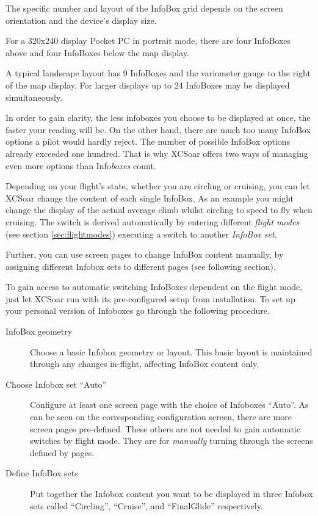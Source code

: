 The specific number and layout of the InfoBox grid depends on the
screen orientation and the device's display size.  

For a 320x240 display
Pocket PC in portrait mode, there are four InfoBoxes above and four
InfoBoxes below the map display.  %

A typical landscape layout has 9 InfoBoxes and the variometer gauge 
to the right of the map display. 
For larger displays up to 24 InfoBoxes may be displayed simultaneously.  

In order to gain clarity, the less infoboxes you choose to be displayed at once, 
the faster your reading will be. On the other hand, there are much too many 
InfoBox options a pilot would hardly reject. The number of possible InfoBox 
options already exceeded one hundred. That is why XCSoar offers two ways of 
managing even more options than Info\emph{boxes} count.

Depending on your flight's state, whether you are circling or cruising, you can 
let XCSoar change the content of each single InfoBox. As an example you might 
change the display of the actual average climb whilst circling to speed to fly 
when cruising. The switch is derived automatically by entering different 
\emph{flight modes} (see section \ref{sec:flightmodes}) executing a switch to 
another \emph{InfoBox set}.

Further, you can use screen pages to change InfoBox content manually, by 
assigning different Infobox sets to different pages (see following section).

To gain access to automatic switching InfoBoxes dependent on the flight mode, 
just let XCSoar run with its pre-configured setup from installation. To set up 
your personal version of Infoboxes go through the following procedure.
\begin{description}
\item[InfoBox geometry] Choose a basic Infobox geometry or layout.  This basic 
layout is maintained through any changes in-flight, affecting InfoBox content 
only.
\item[Choose Infobox set ``Auto''] Configure at least one screen page with the
choice of Infoboxes ``Auto''. As can be seen on the corresponding configuration
screen, there are more screen pages pre-defined.   These 
others are not needed to gain automatic switches by flight mode. They are for \emph{manually} turning through the screens defined by pages. 
\item[Define InfoBox sets] Put together the Infobox content you want to be 
displayed in three Infobox sets called ``Circling'', ``Cruise'', and ``FinalGlide''
respectively.
\end{description}  


